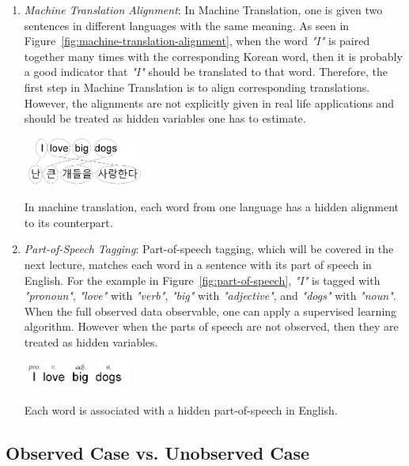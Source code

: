 \documentclass[justified, marginals=justified]{tufte-handout}
\theoremstyle{definition}
\begin{document}
\begin{enumerate}
	\item \textit{Machine Translation Alignment}: 
	In Machine Translation, one is given two sentences in different languages with the same meaning. As seen in Figure~\ref{fig:machine-translation-alignment}, when the word \textit{"I"} is paired together many times with the corresponding Korean word, then it is probably a good indicator that \textit{"I"} should be translated to that word. Therefore, the first step in Machine Translation is to align corresponding translations. However, the alignments are not explicitly given in real life applications and should be treated as hidden variables one has to estimate. 
		\begin{marginfigure}[-3cm]%
			\centering
			\includegraphics[width=4cm]{machine-translation-alignment.png}
			\caption{In machine translation, each word from one language has a hidden alignment to its counterpart.}
			\label{fig:machine-translation-alignment}
		\end{marginfigure}	

	\item \textit{Part-of-Speech Tagging}: Part-of-speech tagging, which will be covered in the next lecture, matches each word in a sentence with its part of speech in English. For the example in Figure~\ref{fig:part-of-speech}, \textit{"I"} is tagged with \textit{"pronoun"}, \textit{"love"} with \textit{"verb"}, \textit{"big"} with \textit{"adjective"}, and \textit{"dogs"} with \textit{"noun"}. When the full observed data observable, one can apply a supervised learning algorithm. However when the parts of speech are not observed, then they are treated as hidden variables. 
		\begin{marginfigure}[-3cm]%
			\centering
			\includegraphics[width=3.5cm]{part-of-speech.png}
			\caption{Each word is associated with a hidden part-of-speech in English.}
			\label{fig:part-of-speech}
		\end{marginfigure}	
\end{enumerate}

\subsection{Observed Case vs. Unobserved Case}\label{sec:observed-case-vs-unobserved-case}
\end{document}
